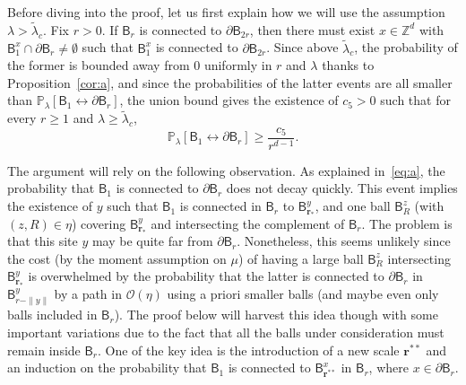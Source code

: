 \documentclass[AHL,Unicode,longabstracts]{cedram}
\newcommand{\rbf}{\mathbf{r}}
\begin{document}
\begin{rema}
Before diving into the proof, let us first explain how we will use the assumption $\lambda>\widetilde\lambda_c$. Fix $r>0$. If $\mathsf B_r$ is connected to $ \partial\mathsf B_{2r}$, then there must exist $x\in{\mathbb Z}^d$ with $\mathsf B^x_1\cap\partial\mathsf B_r\ne \emptyset$ such that $\mathsf B^x_1$ is connected to $\partial\mathsf B_{2r}$.
Since above $\widetilde\lambda_c$, the probability of the former is bounded away from 0 uniformly in $r$ and $\lambda$ thanks to Proposition~\ref{cor:a}, and since the probabilities of the latter events are all smaller than ${\mathbb P}_\lambda[\mathsf B_1\longleftrightarrow \partial\mathsf B_r]$, the union bound gives the existence of $c_5>0$ such that for every $r\ge1$ and $\lambda\ge\widetilde\lambda_c$,
\begin{equation}\label{eq:a}
{\mathbb P}_\lambda[\mathsf B_1\longleftrightarrow \partial\mathsf B_r]\ge \frac{c_5}{r^{d-1}}.
\end{equation}
\end{rema}

The argument will rely on the following observation. As explained in~\eqref{eq:a}, the probability that $\mathsf B_1$ is connected to $\partial\mathsf B_r$ does not decay quickly. This event implies the existence of $y$ such that $\mathsf B_1$ is connected in $\mathsf B_r$ to $\mathsf B_{\rbf_*}^y$, and one ball $\mathsf B_R^z$ (with $(z,R)\in\eta$) covering $\mathsf B_{\rbf_*}^y$ and intersecting the complement of $\mathsf B_r$. The problem is that this site $y$ may be quite far from $\partial\mathsf B_r$. Nonetheless, this seems unlikely since the cost (by the moment assumption on $\mu$) of having a large ball $\mathsf B_R^z$ intersecting $\mathsf B_{\rbf_*}^y$ is overwhelmed by the probability that the latter is connected to $\partial\mathsf B_r$ in $\mathsf B_{r-\|y\|}^y$ by a path in ${\mathcal O}(\eta)$ using a priori smaller balls (and maybe even only balls included in $\mathsf B_r$). The proof below will harvest this idea though with some important variations due to the fact that all the balls under consideration must remain inside $\mathsf B_r$. One of the key idea is the introduction of a new scale $\rbf^{**}$ and an induction on the probability that $\mathsf B_1$ is connected to $\mathsf B_{\rbf^{**}}^x$ in $\mathsf B_r$, where $x\in\partial\mathsf B_r$.
\end{document}
